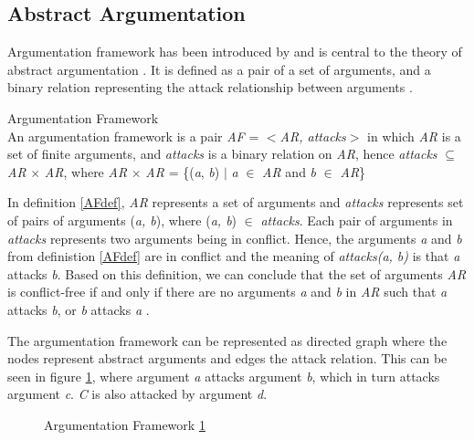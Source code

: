 \subsection{Abstract Argumentation} \label{abstractArgumentation}
Argumentation framework has been introduced by \citet{dung1995} and is central to the theory of abstract argumentation \citep{baroni2011introduction}. It is defined as a pair of a set of arguments, and a binary relation representing the attack relationship between arguments \citep{dung1995}. 

\theoremstyle{definition}
\begin{definition}{Argumentation Framework}
\label{AFdef}\\
An argumentation framework is a pair \textit{AF} = $<$\textit{AR, attacks}$>$ in which \textit{AR} is a set of finite arguments, and \textit{attacks} is a binary relation on \textit{AR}, hence \textit{attacks} $\subseteq$ \textit{AR} $\times$ \textit{AR}, where \textit{AR} $\times$ \textit{AR} = \{(\textit{a}, \textit{b}) $\vert$ \textit{a} $\in$ \textit{AR} and \textit{b} $\in$ \textit{AR}\}
\end{definition}

In definition \ref{AFdef}, \textit{AR} represents a set of arguments and \textit{attacks} represents set of pairs of arguments (\textit{a, b}), where (\textit{a, b}) $\in$ \textit{attacks}. Each pair of arguments in \textit{attacks} represents two arguments being in conflict. Hence, the arguments \textit{a} and \textit{b} from definistion \ref{AFdef} are in conflict and the meaning of \textit{attacks(a, b)} is that \textit{a} attacks \textit{b}. Based on this definition, we can conclude that the set of arguments \textit{AR} is conflict-free if and only if there are no arguments \textit{a} and \textit{b} in \textit{AR} such that \textit{a} attacks \textit{b}, or \textit{b} attacks \textit{a} \citep{dung1995}.

The argumentation framework can be represented as directed graph where the nodes represent abstract arguments and edges the attack relation. This can be seen in figure \ref{fig:argumentationFrameworkFigure}, where argument \textit{a} attacks argument \textit{b}, which in turn attacks argument \textit{c}. \textit{C} is also attacked by argument \textit{d}.
\newpage
\begin{figure}[h]
\centering
{}
\caption{Argumentation Framework \ref{fig:argumentationFrameworkFigure}}
\label{fig:argumentationFrameworkFigure}
\end{figure}
 
